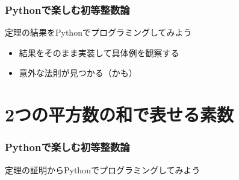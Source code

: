 \documentclass[dvipdfmx,11pt,notheorems]{beamer}
\theoremstyle{definition}
\newtheorem{definition}{定義}
\begin{document}
\begin{frame}\frametitle{Pythonで楽しむ初等整数論}

\begin{block}{定理の結果をPythonでプログラミングしてみよう}
\begin{itemize}
\item 結果をそのまま実装して具体例を観察する
\item 意外な法則が見つかる（かも）
\end{itemize}
\end{block}

\end{frame}

\section{2つの平方数の和で表せる素数}

\begin{frame}\frametitle{Pythonで楽しむ初等整数論}
\huge{定理の証明からPythonでプログラミングしてみよう}
\end{frame}

%
%
%
%
%
%
%
%
%
%
%
\end{document}
